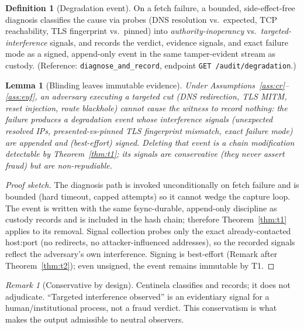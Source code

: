\documentclass[11pt,a4paper]{article}
\theoremstyle{plain}
\newtheorem{lemma}{Lemma}
\theoremstyle{definition}
\newtheorem{definition}{Definition}
\theoremstyle{remark}
\newtheorem{remark}{Remark}
\newcommand{\code}[1]{\texttt{#1}}
\begin{document}
\begin{definition}[Degradation event]
On a fetch failure, a bounded, side-effect-free diagnosis classifies the
cause via probes (DNS resolution vs.\ expected, TCP reachability, TLS
fingerprint vs.\ pinned) into \emph{authority-inoperancy} vs.\
\emph{targeted-interference} signals, and records the verdict, evidence
signals, and exact failure mode as a signed, append-only event in the
same tamper-evident stream as custody. (Reference:
\code{diagnose\_and\_record}, endpoint \code{GET /audit/degradation}.)
\end{definition}

\begin{lemma}[Blinding leaves immutable evidence]
\label{lem:blind}
Under Assumptions~\ref{ass:cr}--\ref{ass:euf}, an adversary executing a
targeted cut (DNS redirection, TLS MITM, reset injection, route
blackhole) cannot cause the witness to record \emph{nothing}: the
failure produces a degradation event whose interference signals
(unexpected resolved IPs, presented-vs-pinned TLS fingerprint mismatch,
exact failure mode) are appended and (best-effort) signed. Deleting that
event is a chain modification detectable by Theorem~\ref{thm:t1}; its
signals are conservative (they never \emph{assert} fraud) but are
non-repudiable.
\end{lemma}

\begin{proof}[Proof sketch]
The diagnosis path is invoked unconditionally on fetch failure and is
bounded (hard timeout, capped attempts) so it cannot wedge the capture
loop. The event is written with the same fsync-durable, append-only
discipline as custody records and is included in the hash chain;
therefore Theorem~\ref{thm:t1} applies to its removal. Signal
collection probes only the exact already-contacted host:port (no
redirects, no attacker-influenced addresses), so the recorded signals
reflect the adversary's own interference. Signing is best-effort
(Remark after Theorem~\ref{thm:t2}); even unsigned, the event remains
immutable by T1.
\end{proof}

\begin{remark}[Conservative by design]
Centinela classifies and records; it does not adjudicate. ``Targeted
interference observed'' is an evidentiary signal for a human/institutional
process, not a fraud verdict. This conservatism is what makes the output
admissible to neutral observers.
\end{remark}
\end{document}

